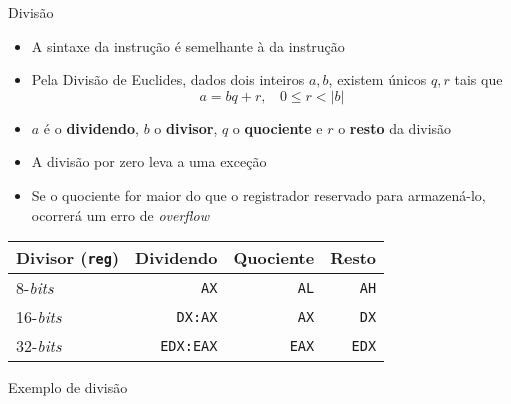 \begin{frame}[fragile]{Divisão}

    \begin{itemize}
        \item A sintaxe da instrução  é semelhante à da instrução 


        \item Pela Divisão de Euclides, dados dois inteiros $a, b$, existem únicos $q, r$ tais
        que
        \[
            a = bq + r, \ \ \ \ 0 \leq r < |b|
        \]

        \item $a$ é o \textbf{dividendo}, $b$ o \textbf{divisor}, $q$ o \textbf{quociente} e 
            $r$ o \textbf{resto} da divisão

        \item A divisão por zero leva a uma exceção

        \item Se o quociente for maior do que o registrador reservado para armazená-lo, ocorrerá um
            erro de \textit{overflow}
    \end{itemize}

    \begin{table}[ht]
        \centering

        \begin{tabular}{lrrr}
            \toprule
            \textbf{Divisor} (\texttt{reg}) & \textbf{Dividendo} & \textbf{Quociente} & 
                \textbf{Resto} \\
            \midrule
                8-\textit{bits} & \texttt{AX} & \texttt{AL} & \texttt{AH} \\
                16-\textit{bits} & \texttt{DX:AX} & \texttt{AX} & \texttt{DX} \\
                32-\textit{bits} & \texttt{EDX:EAX} & \texttt{EAX} & \texttt{EDX} \\
            \bottomrule
        \end{tabular}
        
    \end{table}

\end{frame}

\begin{frame}[fragile]{Exemplo de divisão}
\end{frame}

